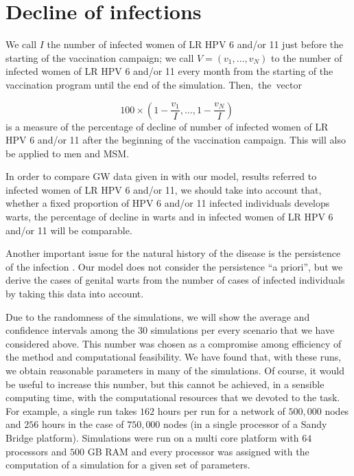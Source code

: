 \section{Decline of infections}

We call $I$ the number of infected women of LR HPV 6 and/or 11 just before the starting of the vaccination campaign; we call $V = ( v_1, \ldots, v_N)$ to the number of infected women of LR HPV 6 and/or 11 every month from the starting of the vaccination program until the end of the simulation. Then,~the~vector 

\begin{equation}
100 \times \left( 1-\displaystyle\frac{v_1}{I}, \ldots, 1-\displaystyle\frac{v_N}{I} \right) \; 
\end{equation}
is a measure of the percentage of decline of number of infected women of LR HPV 6 and/or 11 after the beginning of the vaccination campaign. This will also be applied to men and MSM.

In order to compare GW data given in \cite{ali2013genital} with our model, results referred to infected women of LR HPV 6 and/or 11, we should take into account that, whether a fixed proportion of HPV 6 and/or 11 infected individuals develops warts, the percentage of decline in warts and in infected women of LR HPV 6 and/or 11 will be comparable. 

Another important issue for the natural history of the disease is the persistence of the infection \cite{campos2014updated}. Our model does not consider the persistence ``a priori'', but we derive the cases of genital warts from the number of cases of infected individuals by taking this data into account.


Due to the randomness of the simulations, we will show the average and confidence intervals among the $30$ simulations per every scenario that we have considered above. This number was chosen as a compromise among efficiency of the method and computational feasibility. We have found that, with these runs, we obtain reasonable parameters in many of the simulations. Of course, it would be useful to increase this number, but this cannot be achieved, in a sensible computing time, with the computational resources that we devoted to the task. For example, a single run takes $162$ hours per run for a network of $500,000$ nodes and $256$ hours in the case of $750,000$ nodes (in a single processor of a Sandy Bridge platform). Simulations were run on a multi core platform with $64$ processors and $500$ GB RAM and every processor was assigned with the computation of a simulation for a given set of parameters.

